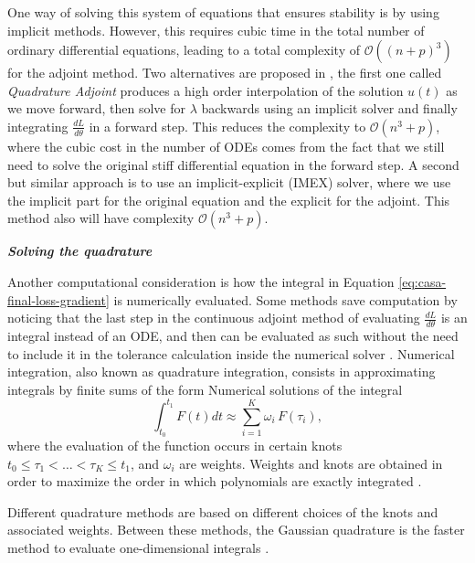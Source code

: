 One way of solving this system of equations that ensures stability is by using implicit methods. 
However, this requires cubic time in the total number of ordinary differential equations, leading to a total complexity of $\mathcal O((n+p)^3)$ for the adjoint method.
Two alternatives are proposed in \cite{kim_stiff_2021}, the first one called \textit{Quadrature Adjoint} produces a high order interpolation of the solution $u(t)$ as we move forward, then solve for $\lambda$ backwards using an implicit solver and finally integrating $\frac{dL}{d\theta}$ in a forward step.
This reduces the complexity to $\mathcal O (n^3 + p)$, where the cubic cost in the number of ODEs comes from the fact that we still need to solve the original stiff differential equation in the forward step. 
A second but similar approach is to use an implicit-explicit (IMEX) solver, where we use the implicit part for the original equation and the explicit for the adjoint. 
This method also will have complexity $\mathcal O (n^3 + p)$.

\vspace*{10px}
\noindent \textbf{\textit{Solving the quadrature}}
\vspace*{5px}

Another computational consideration is how the integral in Equation \eqref{eq:casa-final-loss-gradient} is numerically evaluated. 
Some methods save computation by noticing that the last step in the continuous adjoint method of evaluating $\frac{dL}{d\theta}$ is an integral instead of an ODE, and then can be evaluated as such without the need to include it in the tolerance calculation inside the numerical solver \cite{that-is-not-an-ode}.
Numerical integration, also known as quadrature integration, consists in approximating integrals by finite sums of the form
Numerical solutions of the integral 
\begin{equation}
    \int_{t_0}^{t_1} 
    F(t) dt
    \approx
    \sum_{i=1}^K \omega_i \, F(\tau_i),
\end{equation}
where the evaluation of the function occurs in certain knots $t_0 \leq \tau_1 < \ldots < \tau_K \leq t_1$, and $\omega_i$ are weights. 
Weights and knots are obtained in order to maximize the order in which polynomials are exactly integrated \cite{stoer2002-numerical}. 

Different quadrature methods are based on different choices of the knots and associated weights.
Between these methods, the Gaussian quadrature is the faster method to evaluate one-dimensional integrals \cite{Norcliffe_gaussquadrature_2023}.

